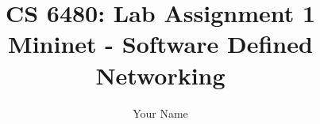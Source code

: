 \documentclass[letterpaper,twocolumn,10pt]{article}
\title{CS 6480: Lab Assignment 1\\
Mininet - Software Defined Networking}
\author{Your Name}
\affil{School of Computing, University of Utah}
\begin{document}
\maketitle



{
  \small 
  
  
}
\end{document}
